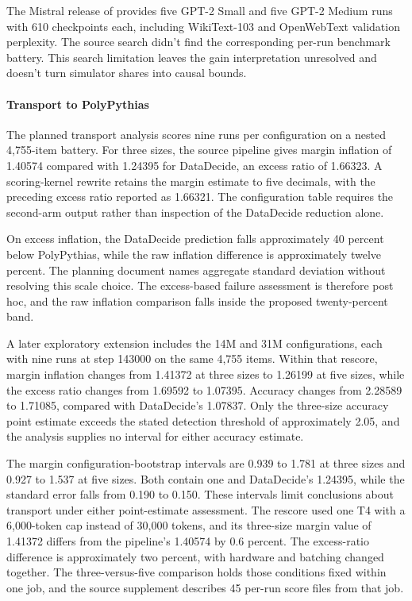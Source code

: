 The Mistral release of \citet{karamcheti2021} provides five GPT-2 Small and five GPT-2 Medium runs with 610 checkpoints each, including WikiText-103 and OpenWebText validation perplexity. The source search didn't find the corresponding per-run benchmark battery. This search limitation leaves the gain interpretation unresolved and doesn't turn simulator shares into causal bounds.

\paragraph{Transport to PolyPythias}
The planned transport analysis scores nine runs per configuration on a nested 4,755-item battery. For three sizes, the source pipeline gives margin inflation of 1.40574 compared with 1.24395 for DataDecide, an excess ratio of 1.66323. A scoring-kernel rewrite retains the margin estimate to five decimals, with the preceding excess ratio reported as 1.66321. The configuration table requires the second-arm output rather than inspection of the DataDecide reduction alone.

On excess inflation, the DataDecide prediction falls approximately 40 percent below PolyPythias, while the raw inflation difference is approximately twelve percent. The planning document names aggregate standard deviation without resolving this scale choice. The excess-based failure assessment is therefore post hoc, and the raw inflation comparison falls inside the proposed twenty-percent band.

A later exploratory extension includes the 14M and 31M configurations, each with nine runs at step 143000 on the same 4,755 items. Within that rescore, margin inflation changes from 1.41372 at three sizes to 1.26199 at five sizes, while the excess ratio changes from 1.69592 to 1.07395. Accuracy changes from 2.28589 to 1.71085, compared with DataDecide's 1.07837. Only the three-size accuracy point estimate exceeds the stated detection threshold of approximately 2.05, and the analysis supplies no interval for either accuracy estimate.

The margin configuration-bootstrap intervals are 0.939 to 1.781 at three sizes and 0.927 to 1.537 at five sizes. Both contain one and DataDecide's 1.24395, while the standard error falls from 0.190 to 0.150. These intervals limit conclusions about transport under either point-estimate assessment. The rescore used one T4 with a 6,000-token cap instead of 30,000 tokens, and its three-size margin value of 1.41372 differs from the pipeline's 1.40574 by 0.6 percent. The excess-ratio difference is approximately two percent, with hardware and batching changed together. The three-versus-five comparison holds those conditions fixed within one job, and the source supplement describes 45 per-run score files from that job.

